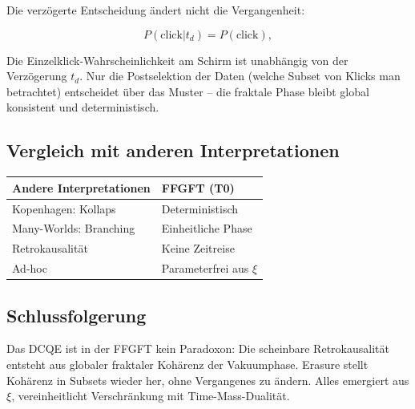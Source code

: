 	Die verzögerte Entscheidung ändert nicht die Vergangenheit:
	
	\begin{equation}
		P(\text{click}|t_d) = P(\text{click}),
	\end{equation}
	
	Die Einzelklick-Wahrscheinlichkeit am Schirm ist unabhängig von der Verzögerung \(t_d\). Nur die Postselektion der Daten (welche Subset von Klicks man betrachtet) entscheidet über das Muster – die fraktale Phase bleibt global konsistent und deterministisch.
	
	\subsection*{Vergleich mit anderen Interpretationen}
	
	\begin{center}
		\begin{tabular}{p{}p{}}
			\textbf{Andere Interpretationen} & \textbf{FFGFT (T0)} \\
			\hline
			Kopenhagen: Kollaps & Deterministisch \\
			Many-Worlds: Branching & Einheitliche Phase \\
			Retrokausalität & Keine Zeitreise \\
			Ad-hoc & Parameterfrei aus \(\xi\) \\
		\end{tabular}
	\end{center}
	
	\subsection*{Schlussfolgerung}
	
	Das DCQE ist in der FFGFT kein Paradoxon: Die scheinbare Retrokausalität entsteht aus globaler fraktaler Kohärenz der Vakuumphase. Erasure stellt Kohärenz in Subsets wieder her, ohne Vergangenes zu ändern. Alles emergiert aus \(\xi\), vereinheitlicht Verschränkung mit Time-Mass-Dualität.




